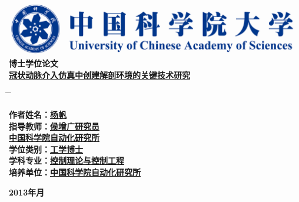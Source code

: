\vspace*{1.2cm} %
\begin{center}
  \includegraphics[width=13.5cm]{../Figures/UCAS}\\
\vspace{1.7cm} {\yihao \hei \textbf{博士学位论文}}\\
\vspace{2.4cm}
{\xiaoerhao \song \textbf{\underline{冠状动脉介入仿真中创建解剖环境的关键技术研究}}}\\
\end{center}
\sanhao \vspace{2.0cm}
\begin{tabbing}
\hspace*{-0.8cm} \= \hspace{6.4cm} \= \kill

\>\textbf{作者姓名：\underline{\hspace{4.8cm}杨\;\;\;\;帆\;\;\hspace{6.3cm}}}\\
\>\textbf{指导教师：\underline{\hspace{4.8cm}侯增广\;\;研究员\hspace{4.6cm}}}\\
\>\textbf{\hspace*{2.8cm}\underline{\hspace{3cm}中国科学院自动化研究所 \hspace{4cm}}}\\

\>\textbf{学位类别：\underline{\hspace{4.8cm}工学博士\hspace{6.0cm}}}\\

\>\textbf{学科专业：\underline{\hspace{3.55cm}控制理论与控制工程\hspace{4.5cm}}}\\


\>\textbf{培养单位：\underline{\hspace{3cm}中国科学院自动化研究所 \hspace{4cm}}}\\

\end{tabbing}
\begin{center}
\vspace{1.0cm}
  \textbf{2013\;\;年\;\;\;月}
\end{center}
